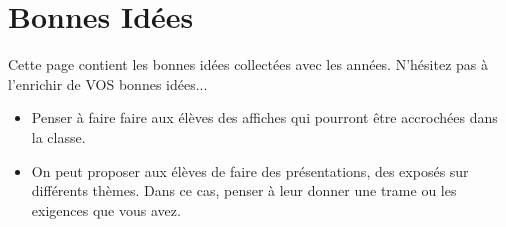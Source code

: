 \chapter{Bonnes Idées}\label{ChBonnesIdees}

Cette page contient les bonnes idées collectées avec les années. N'hésitez pas à l'enrichir de VOS bonnes idées...\\

\begin{itemize}
    \item Penser à faire faire aux élèves des affiches qui pourront être accrochées dans la classe.
    \item On peut proposer aux élèves de faire des présentations, des exposés sur différents thèmes. Dans ce cas, penser à leur donner une trame ou les exigences que vous avez.
\end{itemize}

